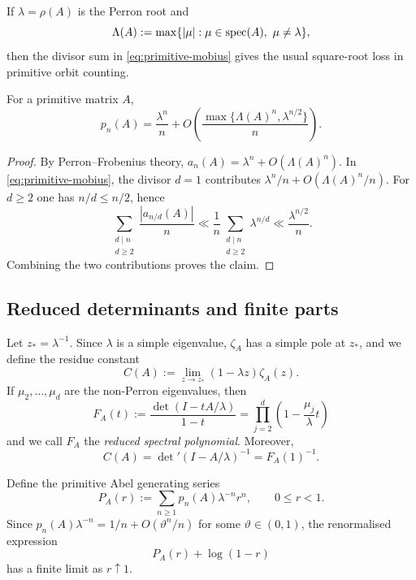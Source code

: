 If \(\lambda=\rho(A)\) is the Perron root and
\[
  \Lambda(A):=\max\{|\mu|:\mu\in\spec(A),\ \mu\neq\lambda\},
\]
then the divisor sum in \eqref{eq:primitive-mobius} gives the usual
square-root loss in primitive orbit counting.

\begin{lemma}\label{lem:primitive-orbit-asymptotic}\label{prop:prelim-prime-orbit}
For a primitive matrix \(A\),
\[
  p_n(A)=\frac{\lambda^n}{n}
  +O\!\left(\frac{\max\{\Lambda(A)^n,\lambda^{n/2}\}}{n}\right).
\]
\end{lemma}

\begin{proof}
By Perron--Frobenius theory,
\(
  a_n(A)=\lambda^n+O(\Lambda(A)^n)
\).
In \eqref{eq:primitive-mobius}, the divisor \(d=1\) contributes
\(\lambda^n/n+O(\Lambda(A)^n/n)\). For \(d\ge 2\) one has
\(n/d\le n/2\), hence
\[
  \sum_{\substack{d\mid n\\ d\ge 2}}\frac{|a_{n/d}(A)|}{n}
  \ll \frac{1}{n}\sum_{\substack{d\mid n\\ d\ge 2}}\lambda^{n/d}
  \ll \frac{\lambda^{n/2}}{n}.
\]
Combining the two contributions proves the claim.
\end{proof}

\subsection{Reduced determinants and finite parts}

Let \(z_\ast=\lambda^{-1}\). Since \(\lambda\) is a simple eigenvalue,
\(\zeta_A\) has a simple pole at \(z_\ast\), and we define the residue
constant
\begin{equation}\label{eq:residue-constant-def}
  C(A):=\lim_{z\to z_\ast}(1-\lambda z)\zeta_A(z).
\end{equation}
If \(\mu_2,\dots,\mu_d\) are the non-Perron eigenvalues, then
\begin{equation}\label{eq:reduced-det-poly}
  F_A(t):=\frac{\det(I-tA/\lambda)}{1-t}
  =\prod_{j=2}^d\left(1-\frac{\mu_j}{\lambda}t\right)
\end{equation}
and we call \(F_A\) the \emph{reduced spectral polynomial}. Moreover,
\begin{equation}\label{eq:reduced-det-constant}
  C(A)=\det\nolimits'(I-A/\lambda)^{-1}=F_A(1)^{-1}.
\end{equation}

Define the primitive Abel generating series
\[
  P_A(r):=\sum_{n\ge 1}p_n(A)\lambda^{-n}r^n,
  \qquad 0\le r<1.
\]
Since \(p_n(A)\lambda^{-n}=1/n+O(\vartheta^n/n)\) for some
\(\vartheta\in(0,1)\), the renormalised expression
\[
  P_A(r)+\log(1-r)
\]
has a finite limit as \(r\uparrow 1\).

